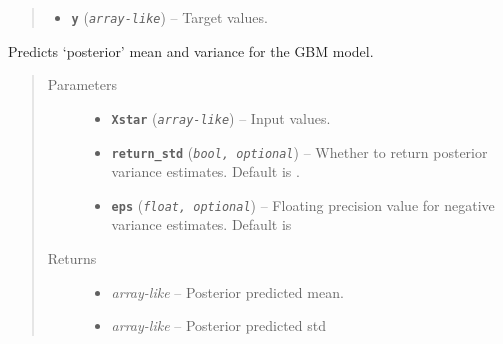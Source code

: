 \documentclass[letterpaper,10pt,english]{sphinxmanual}
\begin{document}
\begin{fulllineitems}
\begin{fulllineitems}
\begin{quote}
\begin{description}
\begin{itemize}
\item {} 
\textbf{\texttt{y}} (\emph{\texttt{array-like}}) -- Target values.

\end{itemize}

\end{description}\end{quote}

\end{fulllineitems}


\begin{fulllineitems}
\label{pyGPGO.surrogates.BoostedTrees:pyGPGO.surrogates.BoostedTrees.BoostedTrees.predict}
Predicts `posterior' mean and variance for the GBM model.
\begin{quote}\begin{description}
\item[{Parameters}] \leavevmode\begin{itemize}
\item {} 
\textbf{\texttt{Xstar}} (\emph{\texttt{array-like}}) -- Input values.

\item {} 
\textbf{\texttt{return\_std}} (\emph{\texttt{bool, optional}}) -- Whether to return posterior variance estimates. Default is .

\item {} 
\textbf{\texttt{eps}} (\emph{\texttt{float, optional}}) -- Floating precision value for negative variance estimates. Default is 

\end{itemize}

\item[{Returns}] \leavevmode
\begin{itemize}
\item {} 
\emph{array-like} -- Posterior predicted mean.

\item {} 
\emph{array-like} -- Posterior predicted std

\end{itemize}


\end{description}\end{quote}

\end{fulllineitems}


\end{fulllineitems}
\end{document}
